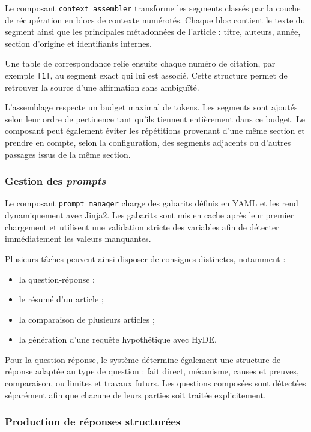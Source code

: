 Le composant \texttt{context\_assembler} transforme les segments classés par la couche
de récupération en blocs de contexte numérotés. Chaque bloc contient le texte du
segment ainsi que les principales métadonnées de l'article : titre, auteurs, année,
section d'origine et identifiants internes.

Une table de correspondance relie ensuite chaque numéro de citation, par exemple
\texttt{[1]}, au segment exact qui lui est associé. Cette structure permet de
retrouver la source d'une affirmation sans ambiguïté.

L'assemblage respecte un budget maximal de tokens. Les segments sont ajoutés selon
leur ordre de pertinence tant qu'ils tiennent entièrement dans ce budget. Le composant
peut également éviter les répétitions provenant d'une même section et prendre en
compte, selon la configuration, des segments adjacents ou d'autres passages issus de
la même section.

\subsubsection{Gestion des \emph{prompts}}

Le composant \texttt{prompt\_manager} charge des gabarits définis en YAML et les rend
dynamiquement avec Jinja2. Les gabarits sont mis en cache après leur premier chargement
et utilisent une validation stricte des variables afin de détecter immédiatement les
valeurs manquantes.

Plusieurs tâches peuvent ainsi disposer de consignes distinctes, notamment :

\begin{itemize}
  \item la question-réponse ;
  \item le résumé d'un article ;
  \item la comparaison de plusieurs articles ;
  \item la génération d'une requête hypothétique avec HyDE.
\end{itemize}

Pour la question-réponse, le système détermine également une structure de réponse
adaptée au type de question : fait direct, mécanisme, causes et preuves, comparaison,
ou limites et travaux futurs. Les questions composées sont détectées séparément afin
que chacune de leurs parties soit traitée explicitement.

\subsubsection{Production de réponses structurées}

